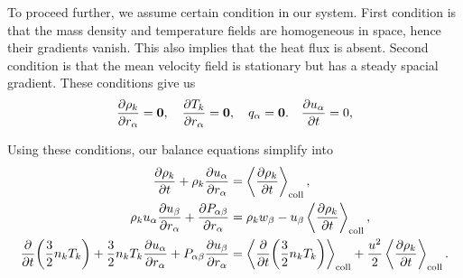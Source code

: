 \documentclass[aps,prl,preprint,groupedaddress,10pt]{revtex4-2}
\begin{document}
To proceed further, we assume certain condition in our system. First condition is that the
mass density and temperature fields are homogeneous in space, hence their gradients vanish.
This also implies that the heat flux is absent. Second condition is that the mean velocity
field is stationary but has a steady spacial gradient. These conditions give us
\begin{equation}
    \pdv{\rho_k}{{r}_{\alpha}}=\vb*{0},\quad\pdv{T_k}{{r}_{\alpha}}=\vb*{0},\quad{q}_{\alpha}=\vb*{0}.
    \quad\pdv{{u}_{\alpha}}{t}=0,
\end{equation}

Using these conditions, our balance equations simplify into
\begin{equation}
    \begin{split}
        \pdv{\rho_k}{t}+\rho_k\pdv{\ia{u}}{\ia{r}} &=\ltx{\avg{\pdv{\rho_k}{t}}}{coll},\\
        \rho_k\ia{u}\pdv{\ib{u}}{\ia{r}}+\pdv{\iab{P}}{\ia{r}}&=
        \rho_k\ib{w}-\ib{u}\ltx{\avg{\pdv{\rho_k}{t}}}{coll},\\
        \pdv{t}\pqty{\frac{3}{2}n_kT_k}+\frac{3}{2}n_kT_k\pdv{\ia{u}}{\ia{r}}+
        \iab{P}\pdv{\ib{u}}{\ia{r}}&=
        \ltx{\avg{\pdv{t}\pqty{\frac{3}{2}n_kT_k}}}{coll}+
        \frac{u^2}{2}\ltx{\avg{\pdv{\rho_k}{t}}}{coll}.
    \end{split}
\end{equation}
\end{document}
